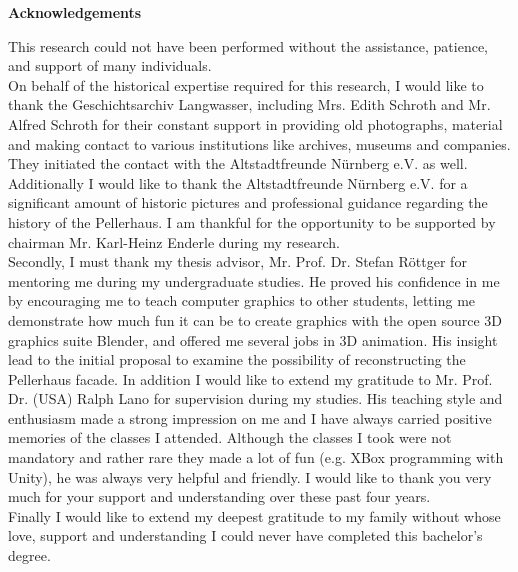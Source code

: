 \thispagestyle{plain}
\begin{center}
	
	\LARGE
	\textbf{Acknowledgements}
	
\end{center}
\vspace{100pt}

This research could not have been performed without the assistance, patience, and support of many individuals.\\

On behalf of the historical expertise required for this research, I would like to thank the Geschichtsarchiv Langwasser, including Mrs. Edith Schroth and Mr. Alfred Schroth for their constant support in providing old photographs, material and making contact to various institutions like archives, museums and companies. They initiated the contact with the Altstadtfreunde Nürnberg e.V. as well.\\
Additionally I would like to thank the Altstadtfreunde Nürnberg e.V. for a significant amount of historic pictures and professional guidance regarding the history of the Pellerhaus. I am thankful for the opportunity to be supported by chairman Mr. Karl-Heinz Enderle during my research.\\

Secondly, I must thank my thesis advisor, Mr. Prof. Dr. Stefan Röttger for mentoring me during my undergraduate studies. He proved his confidence in me by encouraging me to teach computer graphics to other students, letting me demonstrate how much fun it can be to create graphics with the open source 3D graphics suite Blender, and offered me several jobs in 3D animation. His insight lead to the initial proposal to examine the possibility of reconstructing the Pellerhaus facade. In addition I would like to extend my gratitude to Mr. Prof. Dr. (USA) Ralph Lano for supervision during my studies. His teaching style and enthusiasm made a strong impression on me and I have always carried positive memories of the classes I attended. Although the classes I took were not mandatory and rather rare they made a lot of fun (e.g. XBox programming with Unity), he was always very helpful and friendly. I would like to thank you very much for your support and understanding over these past four years.\\

Finally I would like to extend my deepest gratitude to my family without whose love, support and understanding I could never have completed this bachelor's degree.
